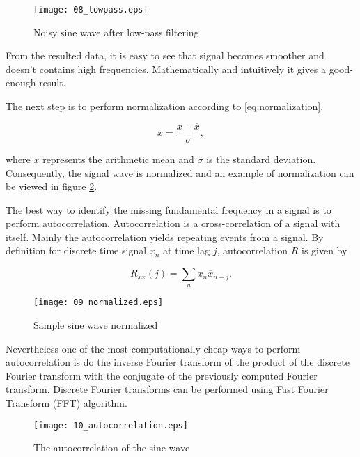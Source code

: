 \begin{figure}[!ht]
\centering
  \texttt{[image: 08\_lowpass.eps]}
\caption{Noisy sine wave after low-pass filtering}
\label{fig:lowpass}
\end{figure}

From the resulted data, it is easy to see that signal becomes smoother and doesn't contains high frequencies. Mathematically and intuitively it gives a good-enough result. 

The next step is to perform normalization according to \eqref{eq:normalization}.

\begin{equation} \label{eq:normalization}
 x = \frac{x - \overline{x}}{\sigma},
\end{equation}

\noindent
where $\overline{x}$ represents the arithmetic mean and $\sigma$ is the standard deviation. Consequently, the signal wave is normalized and an example of normalization can be viewed in figure \ref{fig:normalized}.

The best way to identify the missing fundamental frequency in a signal is to perform autocorrelation. Autocorrelation is a cross-correlation of a signal with itself. Mainly the autocorrelation yields repeating events from a signal. By definition for discrete time signal $x_n$ at time lag $j$, autocorrelation $R$ is given by

\begin{equation}
 R_{xx}(j) = \sum_{n}x_n\overline{x}_{n-j}.
\end{equation}

\begin{figure}[!ht]
\centering
  \texttt{[image: 09\_normalized.eps]}
\caption{Sample sine wave normalized}
\label{fig:normalized}
\end{figure}

Nevertheless one of the most computationally cheap ways to perform autocorrelation is do the inverse Fourier transform of the product of the discrete Fourier transform with the conjugate of the previously computed Fourier transform. Discrete Fourier transforms can be performed using Fast Fourier Transform (FFT) algorithm.

\begin{figure}[!ht]
\centering
  \texttt{[image: 10\_autocorrelation.eps]}
\caption{The autocorrelation of the sine wave}
\label{fig:autocorrelation}
\end{figure}

